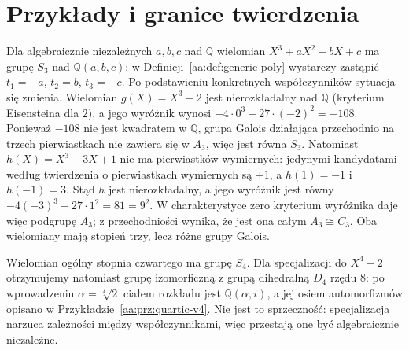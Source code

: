 \section{Przykłady i granice twierdzenia}
\begin{przyklad}
\label{aa:prz:generic-cubic}
Dla algebraicznie niezależnych $a,b,c$ nad $\mathbb Q$
wielomian $X^3+aX^2+bX+c$ ma grupę $S_3$ nad $\mathbb Q(a,b,c)$:
w Definicji~\ref{aa:def:generic-poly} wystarczy zastąpić
$t_1=-a$, $t_2=b$, $t_3=-c$.
Po podstawieniu konkretnych współczynników sytuacja się zmienia.
Wielomian $g(X)=X^3-2$ jest nierozkładalny nad $\mathbb Q$
(kryterium Eisensteina dla $2$), a jego wyróżnik wynosi
$-4\cdot0^3-27\cdot(-2)^2=-108$.
Ponieważ $-108$ nie jest kwadratem w $\mathbb Q$,
grupa Galois działająca przechodnio na trzech pierwiastkach
nie zawiera się w $A_3$, więc jest równa $S_3$.
Natomiast $h(X)=X^3-3X+1$ nie ma pierwiastków wymiernych:
jedynymi kandydatami według twierdzenia o pierwiastkach wymiernych
są $\pm1$, a $h(1)=-1$ i $h(-1)=3$.
Stąd $h$ jest nierozkładalny, a jego wyróżnik jest równy
$-4(-3)^3-27\cdot1^2=81=9^2$.
W charakterystyce zero kryterium wyróżnika daje więc podgrupę
$A_3$; z przechodniości wynika, że jest ona całym
$A_3\cong C_3$. Oba wielomiany mają stopień trzy, lecz różne
grupy Galois.
\end{przyklad}

\begin{przyklad}
\label{aa:prz:generic-specialization}
Wielomian ogólny stopnia czwartego ma grupę $S_4$.
Dla specjalizacji do $X^4-2$ otrzymujemy natomiast grupę
izomorficzną z grupą dihedralną $D_4$ rzędu $8$:
po wprowadzeniu $\alpha=\sqrt[4]{2}$ ciałem rozkładu jest
$\mathbb Q(\alpha,i)$, a jej osiem automorfizmów opisano
w Przykładzie~\ref{aa:prz:quartic-v4}.
Nie jest to sprzeczność: specjalizacja narzuca zależności między
współczynnikami, więc przestają one być algebraicznie niezależne.
\end{przyklad}

